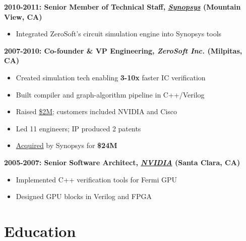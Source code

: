 \documentclass[10pt, letterpaper]{article}
\providecommand{\tightlist}{%
\setlength{\itemsep}{0pt}
\setlength{\parskip}{0pt}}
\begin{document}
  \textbf{2010-2011: Senior Member of Technical Staff,
  \href{https://www.synopsys.com/}{\emph{Synopsys}} (Mountain View, CA)}

  \begin{itemize}
    \tightlist

    \item Integrated ZeroSoft's circuit simulation engine into Synopsys tools
  \end{itemize}

  \textbf{2007-2010: Co-founder \& VP Engineering, \emph{ZeroSoft Inc.} (Milpitas,
  CA)}

  \begin{itemize}
    \tightlist

    \item Created simulation tech enabling \textbf{3-10x} faster IC
      verification

    \item Built compiler and graph-algorithm pipeline in C++/Verilog

    \item Raised \href{https://www.crunchbase.com/organization/zerosoft}{\$2M};
      customers included NVIDIA and Cisco

    \item Led 11 engineers; IP produced 2 patents

    \item \href{https://mergr.com/synopsys-acquires-zerosoft}{Acquired} by
      Synopsys for \textbf{\$24M}
  \end{itemize}

  \textbf{2005-2007: Senior Software Architect,
  \href{https://www.nvidia.com/en-us/}{\emph{NVIDIA}} (Santa Clara, CA)}

  \begin{itemize}
    \tightlist

    \item Implemented C++ verification tools for Fermi GPU

    \item Designed GPU blocks in Verilog and FPGA
  \end{itemize}

  \section{\texorpdfstring{\textbf{Education}}{Education}}
  \label{education}
\end{document}
